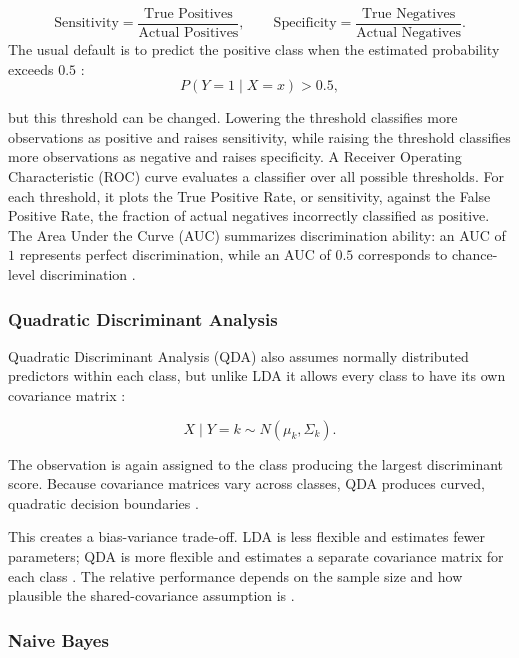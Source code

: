 \documentclass[11pt,letterpaper,reqno]{amsart}
\numberwithin{equation}{subsection}
\theoremstyle{definition}
\numberwithin{thm}{subsection}
\begin{document}
\[
\text{Sensitivity}
=
\frac{\text{True Positives}}{\text{Actual Positives}},
\qquad
\text{Specificity}
=
\frac{\text{True Negatives}}{\text{Actual Negatives}}.
\]
The usual default is to predict the positive class when the estimated probability exceeds $0.5$ \cite[Section 4.4.1, pp. 153--154]{James:2023}:
\[
P(Y=1\mid X=x)>0.5,
\]

but this threshold can be changed. Lowering the threshold classifies more observations as positive and raises sensitivity, while raising the threshold classifies more observations as negative and raises specificity.
A Receiver Operating Characteristic (ROC) curve evaluates a classifier over all possible thresholds. For each threshold, it plots the True Positive Rate, or sensitivity, against the False Positive Rate, the fraction of actual negatives incorrectly classified as positive. The Area Under the Curve (AUC) summarizes discrimination ability: an AUC of $1$ represents perfect discrimination, while an AUC of $0.5$ corresponds to chance-level discrimination \cite[Section 4.4.1, pp. 153--155]{James:2023}.

\subsubsection{Quadratic Discriminant Analysis}

Quadratic Discriminant Analysis (QDA) also assumes normally distributed predictors within each class, but unlike LDA it allows every class to have its own covariance matrix \cite[Section 4.4.3, p. 156]{James:2023}:

\[
X\mid Y=k\sim N(\mu_k,\Sigma_k).
\]

The observation is again assigned to the class producing the largest discriminant score. Because covariance matrices vary across classes, QDA produces curved, quadratic decision boundaries \cite[Equation 4.28, p. 157]{James:2023}.

This creates a bias-variance trade-off. LDA is less flexible and estimates fewer parameters; QDA is more flexible and estimates a separate covariance matrix for each class \cite[Section 4.4.3, pp. 156--158]{James:2023}. The relative performance depends on the sample size and how plausible the shared-covariance assumption is \cite[Section 4.5.1, pp. 161--163]{James:2023}.

\subsubsection{Naive Bayes}
\end{document}
